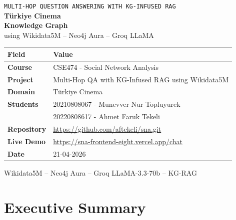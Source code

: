 \documentclass[11pt,a4paper]{article}
\newcommand{\tblhead}[1]{\cellcolor{NavyDark}\textbf{\color{white}\small #1}}
\begin{document}
\begin{titlepage}
\thispagestyle{empty}
\begin{tcolorbox}[enhanced,arc=0pt,boxrule=0pt,colback=NavyDark,width=\textwidth,height=5.5cm,left=8pt,right=8pt,top=18pt,bottom=18pt]
\begin{center}
{\fontsize{11}{13}\selectfont\color{TealAccent}\texttt{MULTI-HOP QUESTION ANSWERING WITH KG-INFUSED RAG}}\\[8pt]
{\fontsize{30}{34}\selectfont\bfseries\color{white}Türkiye Cinema}\\[2pt]
{\fontsize{30}{34}\selectfont\bfseries\color{white}Knowledge Graph}\\[6pt]
{\fontsize{13}{15}\selectfont\color{white!75}using Wikidata5M -- Neo4j Aura -- Groq LLaMA}
\end{center}
\end{tcolorbox}

\vspace{1.2cm}
\begin{center}
\begin{tabular}{@{}L{3.8cm}L{9.2cm}@{}}
\toprule
{}
\tblhead{Field} & \tblhead{Value} \\
\midrule
\textbf{Course} & CSE474 - Social Network Analysis \\
\textbf{Project} & Multi-Hop QA with KG-Infused RAG using Wikidata5M \\
\textbf{Domain} & Türkiye Cinema \\
\textbf{Students} & 20210808067 - Munevver Nur Topluyurek \\
& 20220808617 - Ahmet Faruk Tekeli \\
\textbf{Repository} & \url{https://github.com/aftekeli/sna.git} \\
\textbf{Live Demo} & \url{https://sna-frontend-eight.vercel.app/chat} \\
\textbf{Date} & 21-04-2026 \\
\bottomrule
\end{tabular}
\end{center}
\vfill
\begin{center}
\small\color{MutedGray}Wikidata5M -- Neo4j Aura -- Groq LLaMA-3.3-70b -- KG-RAG
\end{center}
\end{titlepage}

\newpage
\tableofcontents
\newpage

\section{Executive Summary}
\end{document}
